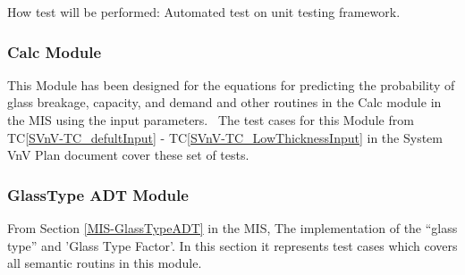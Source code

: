 \documentclass[12pt]{article}
\newcommand{\tcref}[1]{TC\ref{#1}}
\begin{document}
\noindent \newline How test will be performed: Automated test on unit testing framework.



\subsubsection{Calc Module}
	
This Module has been designed for the equations for predicting the probability of glass 
breakage, capacity, and demand and other routines in the Calc module in the MIS using the input parameters.
~\newline The test cases for this Module from \tcref{SVnV-TC_defultInput} - 
\tcref{SVnV-TC_LowThicknessInput} in the System VnV Plan document cover these set of tests. 

\subsubsection{GlassType ADT Module}	
From Section \ref{MIS-GlassTypeADT} in the MIS, The implementation of the ``glass type'' and 'Glass Type Factor'. In this section it represents test cases which covers all semantic routins in this module.
\end{document}
